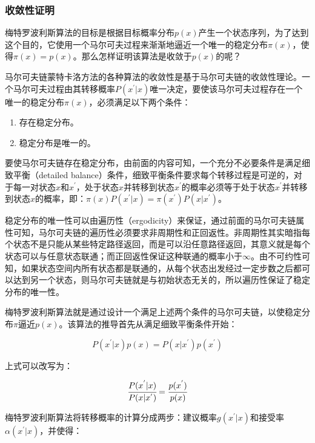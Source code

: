 \subsubsection{收敛性证明}
梅特罗波利斯算法的目标是根据目标概率分布$p(x)$产生一个状态序列，为了达到这个目的，它使用一个马尔可夫过程来渐渐地逼近一个唯一的稳定分布$\pi(x)$，使得$\pi(x)=p(x)$。那么怎样证明该算法是收敛于$p(x)$的呢？

马尔可夫链蒙特卡洛方法的各种算法的收敛性是基于马尔可夫链的收敛性理论。一个马尔可夫过程由其转移概率$P(x^{'}|x)$唯一决定，要使该马尔可夫过程存在一个唯一的稳定分布$\pi(x)$，必须满足以下两个条件：

\begin{enumerate}
	\item 存在稳定分布。
	\item 稳定分布是唯一的。
\end{enumerate}

要使马尔可夫链存在稳定分布，由前面的内容可知，一个充分不必要条件是满足细致平衡（detailed balance）条件，细致平衡条件要求每个转移过程是可逆的，对于每一对状态$x$和$x^{'}$，处于状态$x$并转移到状态$x^{'}$的概率必须等于处于状态$x^{'}$并转移到状态$x$的概率，即：$\pi(x)P(x^{'}|x)=\pi(x^{'})P(x|x^{'})$。

稳定分布的唯一性可以由遍历性（ergodicity）来保证，通过前面的马尔可夫链属性可知，马尔可夫链的遍历性必须要求非周期性和正回返性。非周期性其实暗指每个状态不是只能从某些特定路径返回，而是可以沿任意路径返回，其意义就是每个状态可以与任意状态联通；而正回返性保证这种联通的概率小于$\infty$。由不可约性可知，如果状态空间内所有状态都是联通的，从每个状态出发经过一定步数之后都可以达到另一个状态，则马尔可夫链就是与初始状态无关的，所以遍历性保证了稳定分布的唯一性。

梅特罗波利斯算法就是通过设计一个满足上述两个条件的马尔可夫链，以使稳定分布$\pi$逼近$p(x)$。该算法的推导首先从满足细致平衡条件开始：

\begin{equation}
	P(x^{'}|x)p(x)=P(x|x^{'})p(x^{'})
\end{equation}

\noindent 上式可以改写为：

\begin{equation}
	 \cfrac{P(x^{'}|x)}{P(x|x^{'})}= \cfrac{p(x^{'})}{p(x)}
\end{equation}

梅特罗波利斯算法将转移概率的计算分成两步：建议概率$g(x^{'}|x)$和接受率$\alpha(x^{'}|x)$，并使得：

